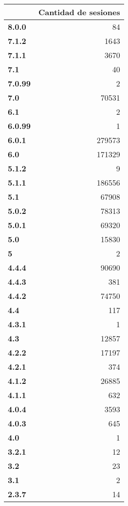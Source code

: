\begin{table}[htbp]
\caption{}
\begin{tabular}{|l|r|}
\hline
 & \multicolumn{1}{l|}{\textbf{Cantidad de sesiones}} \\ \hline
\textbf{8.0.0} & 84 \\ \hline
\textbf{7.1.2} & 1643 \\ \hline
\textbf{7.1.1} & 3670 \\ \hline
\textbf{7.1} & 40 \\ \hline
\textbf{7.0.99} & 2 \\ \hline
\textbf{7.0} & 70531 \\ \hline
\textbf{6.1} & 2 \\ \hline
\textbf{6.0.99} & 1 \\ \hline
\textbf{6.0.1} & 279573 \\ \hline
\textbf{6.0} & 171329 \\ \hline
\textbf{5.1.2} & 9 \\ \hline
\textbf{5.1.1} & 186556 \\ \hline
\textbf{5.1} & 67908 \\ \hline
\textbf{5.0.2} & 78313 \\ \hline
\textbf{5.0.1} & 69320 \\ \hline
\textbf{5.0} & 15830 \\ \hline
\textbf{5} & 2 \\ \hline
\textbf{4.4.4} & 90690 \\ \hline
\textbf{4.4.3} & 381 \\ \hline
\textbf{4.4.2} & 74750 \\ \hline
\textbf{4.4} & 117 \\ \hline
\textbf{4.3.1} & 1 \\ \hline
\textbf{4.3} & 12857 \\ \hline
\textbf{4.2.2} & 17197 \\ \hline
\textbf{4.2.1} & 374 \\ \hline
\textbf{4.1.2} & 26885 \\ \hline
\textbf{4.1.1} & 632 \\ \hline
\textbf{4.0.4} & 3593 \\ \hline
\textbf{4.0.3} & 645 \\ \hline
\textbf{4.0} & 1 \\ \hline
\textbf{3.2.1} & 12 \\ \hline
\textbf{3.2} & 23 \\ \hline
\textbf{3.1} & 2 \\ \hline
\textbf{2.3.7} & 14 \\ \hline

\end{tabular}
\end{table}
